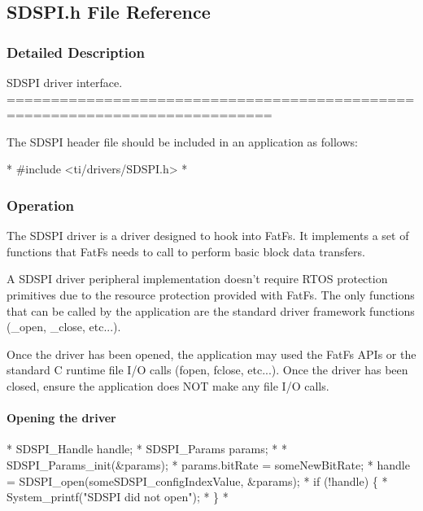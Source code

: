 \subsection{S\-D\-S\-P\-I.\-h File Reference}
\label{_s_d_s_p_i_8h}


\subsubsection{Detailed Description}
S\-D\-S\-P\-I driver interface. ============================================================================

The S\-D\-S\-P\-I header file should be included in an application as follows\-: 
\begin{DoxyCode}
*  #include <ti/drivers/SDSPI.h>
*  
\end{DoxyCode}


\subsubsection*{Operation}

The S\-D\-S\-P\-I driver is a driver designed to hook into Fat\-Fs. It implements a set of functions that Fat\-Fs needs to call to perform basic block data transfers.

A S\-D\-S\-P\-I driver peripheral implementation doesn't require R\-T\-O\-S protection primitives due to the resource protection provided with Fat\-Fs. The only functions that can be called by the application are the standard driver framework functions (\-\_\-open, \-\_\-close, etc...).

Once the driver has been opened, the application may used the Fat\-Fs A\-P\-Is or the standard C runtime file I/\-O calls (fopen, fclose, etc...). Once the driver has been closed, ensure the application does N\-O\-T make any file I/\-O calls.

\paragraph*{Opening the driver}


\begin{DoxyCode}
*  SDSPI_Handle      handle;
*  SDSPI_Params      params;
*
*  SDSPI_Params_init(&params);
*  params.bitRate  = someNewBitRate;
*  handle = SDSPI_open(someSDSPI\_configIndexValue, &params);
*  \textcolor{keywordflow}{if} (!handle) \{
*      System\_printf(\textcolor{stringliteral}{"SDSPI did not open"});
*  \}
*  
\end{DoxyCode}


